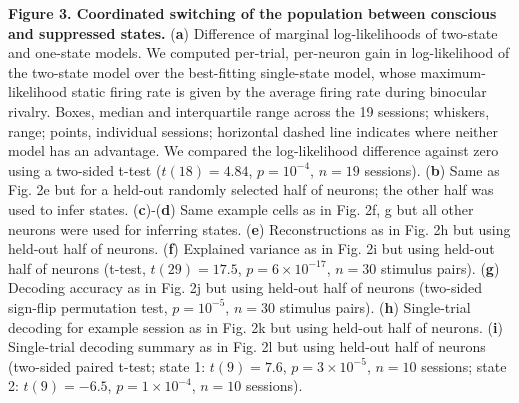 \documentclass{article}
\begin{document}
\noindent\textbf{Figure 3. Coordinated switching of the population between conscious and suppressed states.} (\textbf{a}) Difference of marginal log-likelihoods of two-state and one-state models. We computed per-trial, per-neuron gain in log-likelihood of the two-state model over the best-fitting single-state model, whose maximum-likelihood static firing rate is given by the average firing rate during binocular rivalry. Boxes, median and interquartile range across the 19 sessions; whiskers, range; points, individual sessions; horizontal dashed line indicates where neither model has an advantage. We compared the log-likelihood difference against zero using a two-sided t-test ($t(18) = 4.84$, $p = 10^{-4}$, $n = 19$ sessions). (\textbf{b}) Same as Fig. 2e but for a held-out randomly selected half of neurons; the other half was used to infer states. (\textbf{c})-(\textbf{d}) Same example cells as in Fig. 2f, g but all other neurons were used for inferring states. (\textbf{e}) Reconstructions as in Fig. 2h but using held-out half of neurons. (\textbf{f}) Explained variance as in Fig. 2i but using held-out half of neurons (t-test, $t(29) = 17.5$, $p = 6 \times 10^{-17}$, $n = 30$ stimulus pairs). (\textbf{g}) Decoding accuracy as in Fig. 2j but using held-out half of neurons (two-sided sign-flip permutation test, $p = 10^{-5}$, $n = 30$ stimulus pairs). (\textbf{h}) Single-trial decoding for example session as in Fig. 2k but using held-out half of neurons. (\textbf{i}) Single-trial decoding summary as in Fig. 2l but using held-out half of neurons (two-sided paired t-test; state 1: $t(9) = 7.6$, $p = 3 \times 10^{-5}$, $n = 10$ sessions; state 2: $t(9) = -6.5$, $p = 1 \times 10^{-4}$, $n = 10$ sessions).
\end{document}

